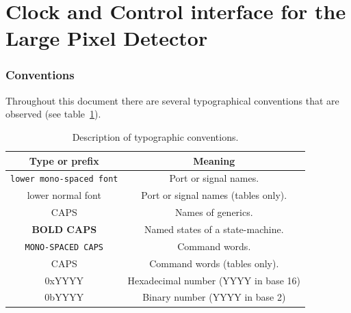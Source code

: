 \part{Clock and Control interface for the Large Pixel Detector} %
\label{prt:lpd_ccc_interface}

\section{Conventions} %
\label{sec:conventions}
Throughout this document there are several typographical conventions that are observed (see table~\ref{tab:typography}).
\begin{table}
  \begin{center}
  \begin{tabular}{c|c}
    Type or prefix                  & Meaning                             \\
    \hline                                                   
    \texttt{lower mono-spaced font} & Port or signal names.               \\
    lower normal font               & Port or signal names (tables only). \\
    CAPS                            & Names of generics.                  \\
    \textbf{BOLD CAPS}              & Named states of a state-machine.    \\
    \texttt{MONO-SPACED CAPS}       & Command words.                      \\
    CAPS                            & Command words (tables only).        \\
    0xYYYY                          & Hexadecimal number (YYYY in base 16)\\
    0bYYYY                          & Binary number (YYYY in base 2)      \\
  \end{tabular}
  \end{center}
  \caption{Description of typographic conventions.}
  \label{tab:typography}
\end{table}
